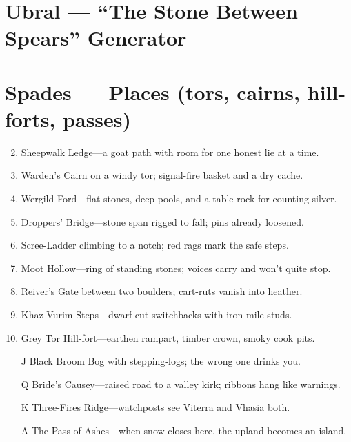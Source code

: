 \section{Ubral --- ``The Stone Between Spears'' Generator}
\label{chap:ubral}

\section*{Spades --- Places (tors, cairns, hill-forts, passes)}
\label{sec:ubral-places}
\begin{enumerate}
\setcounter{enumi}{1}
\item Sheepwalk Ledge---a goat path with room for one honest lie at a time.
\item Warden's Cairn on a windy tor; signal-fire basket and a dry cache.
\item Wergild Ford---flat stones, deep pools, and a table rock for counting silver.
\item Droppers' Bridge---stone span rigged to fall; pins already loosened.
\item Scree-Ladder climbing to a notch; red rags mark the safe steps.
\item Moot Hollow---ring of standing stones; voices carry and won't quite stop.
\item Reiver's Gate between two boulders; cart-ruts vanish into heather.
\item Khaz-Vurim Steps---dwarf-cut switchbacks with iron mile studs.
\item Grey Tor Hill-fort---earthen rampart, timber crown, smoky cook pits.
\item[J] Black Broom Bog with stepping-logs; the wrong one drinks you.
\item[Q] Bride's Causey---raised road to a valley kirk; ribbons hang like warnings.
\item[K] Three-Fires Ridge---watchposts see Viterra and Vhasia both.
\item[A] The Pass of Ashes---when snow closes here, the upland becomes an island.
\end{enumerate}

